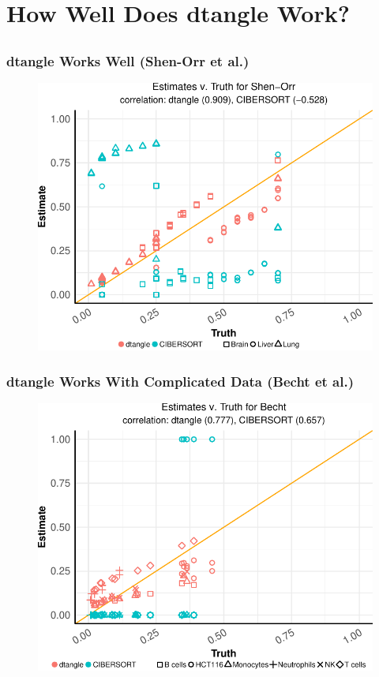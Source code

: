 \documentclass[usenames,dvipsnames,15pt]{beamer}
\begin{document}
\setcounter{subsection}{0}
\section{How Well Does dtangle Work?}
\subsection{}

\begin{frame}
  \frametitle{dtangle Works Well (Shen-Orr et al.)}
  \begin{figure}
   \hspace*{-1cm}
  \includegraphics[scale=.75]{pictures/Shen-Orr_scatter.pdf}
  \end{figure}
\end{frame}


\begin{frame}
  \frametitle{dtangle Works With Complicated Data (Becht et al.)}
  \begin{figure}
   \hspace*{-1cm}
  \includegraphics[scale=.75]{pictures/Becht_scatter.pdf}
  \end{figure}
\end{frame}
\end{document}
